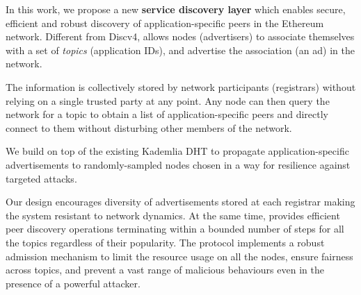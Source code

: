  In this work, we propose a new \textbf{service discovery layer} which enables secure,  efficient and robust  discovery of application-specific peers in the Ethereum network.
Different from Discv4, \sysname allows nodes (\ie advertisers) to associate themselves with a set of \emph{topics} (\eg application IDs), and advertise the association (\ie an ad) in the network. 

The information is collectively stored by network participants (\ie registrars) without relying on a single trusted party at any point. Any node can then query the network for a topic to obtain a list of application-specific peers and directly connect to them without disturbing other members of the network. 

We build \sysname on top of the existing Kademlia DHT to propagate application-specific advertisements to randomly-sampled nodes chosen in a way for resilience against targeted attacks. 

Our design encourages diversity of advertisements stored at each registrar making the system resistant to network dynamics. At the same time, \sysname provides efficient peer discovery operations terminating within a bounded number of steps  for all the topics regardless of their popularity. The protocol implements a robust admission mechanism to limit the resource usage on all the nodes, ensure fairness across topics, and prevent a vast range of malicious behaviours even in the presence of a powerful attacker.

